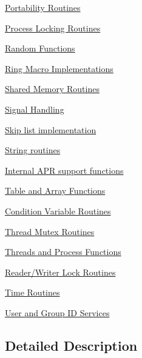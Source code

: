 \begin{DoxyCompactItemize}
\hyperlink{group__apr__portabile}{Portability Routines}
\item 
\hyperlink{group__apr__proc__mutex}{Process Locking Routines}
\item 
\hyperlink{group__apr__random}{Random Functions}
\item 
\hyperlink{group__apr__ring}{Ring Macro Implementations}
\item 
\hyperlink{group__apr__shm}{Shared Memory Routines}
\item 
\hyperlink{group__apr__signal}{Signal Handling}
\item 
\hyperlink{group__apr__skiplist}{Skip list implementation}
\item 
\hyperlink{group__apr__strings}{String routines}
\item 
\hyperlink{group__apr__support}{Internal A\-P\-R support functions}
\item 
\hyperlink{group__apr__tables}{Table and Array Functions}
\item 
\hyperlink{group__apr__thread__cond}{Condition Variable Routines}
\item 
\hyperlink{group__apr__thread__mutex}{Thread Mutex Routines}
\item 
\hyperlink{group__apr__thread__proc}{Threads and Process Functions}
\item 
\hyperlink{group__apr__thread__rwlock}{Reader/\-Writer Lock Routines}
\item 
\hyperlink{group__apr__time}{Time Routines}
\item 
\hyperlink{group__apr__user}{User and Group I\-D Services}
\end{DoxyCompactItemize}


\subsection{Detailed Description}
